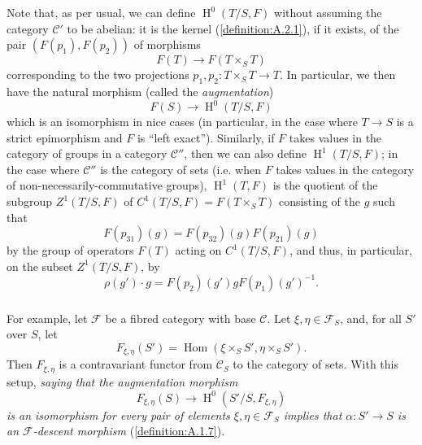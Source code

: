 \documentclass{article}
\theoremstyle{plain}
\theoremstyle{definition}
\newcommand{\sh}[1]{{\mathscr{#1}}}
\newcommand{\cat}[1]{{\mathcal{#1}}}
\DeclareMathOperator{\Hom}{Hom}
\DeclareMathOperator{\HH}{H}
\begin{document}
Note that, as per usual, we can define $\HH^0(T/S,F)$ without assuming the category $\cat{C}'$ to be abelian:
it is the kernel (\cref{definition:A.2.1}), if it exists, of the pair $(F(p_1),F(p_2))$ of morphisms
\[
  F(T) \to F(T\times_S T)
\]
corresponding to the two projections $p_1,p_2\colon T\times_S T\to T$.
In particular, we then have the natural morphism (called the \emph{augmentation})
\[
  F(S) \to \HH^0(T/S,F)
\]
which is an isomorphism in nice cases (in particular, in the case where $T\to S$ is a strict epimorphism and $F$ is ``left exact'').
Similarly, if $F$ takes values in the category of groups in a category $\cat{C}''$, then we can also define $\HH^1(T/S,F)$;
in the case where $\cat{C}''$ is the category of sets (i.e. when $F$ takes values in the category of non-necessarily-commutative groups), $\HH^1(T,F)$ is the quotient of the subgroup $Z^1(T/S,F)$ of $C^1(T/S,F) = F(T\times_S T)$ consisting of the $g$ such that
\[
  F(p_{31})(g) = F(p_{32})(g) F(p_{21})(g)
\]
by the group of operators $F(T)$ acting on $C^1(T/S,F)$, and thus, in particular, on the subset $Z^1(T/S,F)$, by
\[
  \rho(g')\cdot g = F(p_2)(g') g F(p_1)(g')^{-1}.
\]


\subsubsection{}
\label{A.4.b}

For example, let $\sh{F}$ be a fibred category with base $\cat{C}$.
Let $\xi,\eta\in\sh{F}_S$, and, for all $S'$ over $S$, let
\[
  F_{\xi,\eta}(S') = \Hom(\xi\times_S S', \eta\times_S S').
\]
Then $F_{\xi,\eta}$ is a contravariant functor from $\cat{C}_S$ to the category of sets.
With this setup, \emph{saying that the augmentation morphism}
\[
  F_{\xi,\eta}(S) \to \HH^0(S'/S,F_{\xi,\eta})
\]
\emph{is an isomorphism for every pair of elements $\xi,\eta\in\sh{F}_S$ implies that $\alpha\colon S'\to S$ is an $\sh{F}$-descent morphism} (\cref{definition:A.1.7}).


\subsubsection{}
\label{A.4.c}
\end{document}
